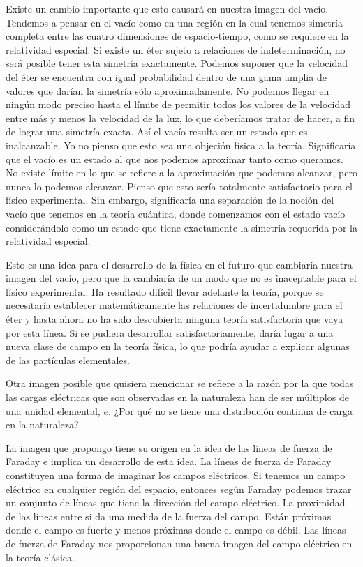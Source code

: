 \documentclass[a4paper, 12pt]{article}
\begin{document}
Existe un cambio importante que esto causará en nuestra imagen del vacío. Tendemos a pensar en el vacío como en una región en la cual tenemos simetría completa entre las cuatro dimensiones de espacio-tiempo, como se requiere en la relatividad especial. Si existe un éter sujeto a relaciones de indeterminación, no será posible tener esta simetría exactamente. Podemos suponer que la velocidad del éter se encuentra con igual probabilidad dentro de una gama amplia de valores que darían la simetría sólo aproximadamente. No podemos llegar en ningún modo preciso hasta el límite de permitir todos los valores de la velocidad entre más y menos la velocidad de la luz, lo que deberíamos tratar de hacer, a fin de lograr una simetría exacta. Así el vacío resulta ser un estado que es inalcanzable. Yo no pienso que esto sea una objeción física a la teoría. Significaría que el vacío es un estado al que nos podemos aproximar tanto como queramos. No existe límite en lo que se refiere a la aproximación que podemos alcanzar, pero nunca lo podemos alcanzar. Pienso que esto sería totalmente satisfactorio para el físico experimental. Sin embargo, significaría una separación de la noción del vacío que tenemos en la teoría cuántica, donde comenzamos con el estado vacío considerándolo como un estado que tiene exactamente la simetría requerida por la relatividad especial.

Esto es una idea para el desarrollo de la física en el futuro que cambiaría nuestra imagen del vacío, pero que la cambiaría de un modo que no es inaceptable para el físico experimental. Ha resultado difícil llevar adelante la teoría, porque se necesitaría establecer matemáticamente las relaciones de incertidumbre para el éter y hasta ahora no ha sido descubierta ninguna teoría satisfactoria que vaya por esta línea. Si se pudiera desarrollar satisfactoriamente, daría lugar a una nueva clase de campo en la teoría física, lo que podría ayudar a explicar algunas de las partículas elementales. 

Otra imagen posible que quisiera mencionar se refiere a la razón por la que todas las cargas eléctricas que son observadas en la naturaleza han de ser múltiplos de una unidad elemental, $e$. ¿Por qué no se tiene una distribución continua de carga en la naturaleza?

La imagen que propongo tiene su origen en la idea de las líneas de fuerza de Faraday e implica un desarrollo de esta idea. La líneas de fuerza de Faraday constituyen una forma de imaginar los campos eléctricos. Si tenemos un campo eléctrico en cualquier región del espacio, entonces según Faraday podemos trazar un conjunto de líneas que tiene la dirección del campo eléctrico. La proximidad de las líneas entre si da una medida de la fuerza del campo. Están próximas donde el campo es fuerte y menos próximas donde el campo es débil. Las líneas de fuerza de Faraday nos proporcionan una buena imagen del campo eléctrico en la teoría clásica.
\end{document}
